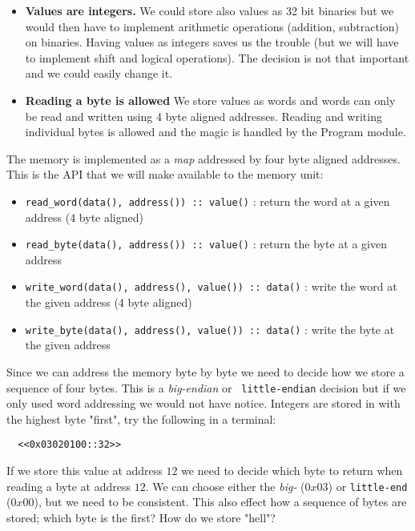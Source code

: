 \documentclass[a4paper,11pt]{article}
\begin{document}
\begin{itemize}

\item {\bf Values are integers.}  We could store also values as 32 bit
  binaries but we would then have to implement arithmetic operations
  (addition, subtraction) on binaries. Having values as integers saves
  us the trouble (but we will have to implement shift and logical
  operations). The decision is not that important and we could easily
  change it.

\item {\bf Reading a byte is allowed} We store values as words and
  words can only be read and written using 4 byte aligned
  addresses. Reading and writing individual bytes is allowed and the
  magic is handled by the Program module. 
\end{itemize}

The memory is implemented as a {\em map} addressed by four byte
aligned addresses. This is the API that we will make available to the
memory unit:

\begin{itemize}
\item {\tt read\_word(data(), address()) :: value()} : return the word  at a given address (4 byte aligned)
\item {\tt read\_byte(data(), address()) :: value()} : return the byte at a given address  
\item {\tt write\_word(data(), address(), value()) :: data()} : write the word at the given address (4 byte aligned)
\item {\tt write\_byte(data(), address(), value()) :: data()} : write the byte at the given address
\end{itemize}

Since we can address the memory byte by byte we need to decide how we
store a sequence of four bytes. This is a {\em big-endian} or {\tt
  little-endian} decision but if we only used word addressing we would
not have notice. Integers are stored in with the highest byte "first",
try the following in a terminal:

\begin{verbatim}
  <<0x03020100::32>>
\end{verbatim}

If we store this value at address $12$ we need to decide which byte to
return when reading a byte at address $12$. We can choose either the
{\em big-} ($0x03$) or {\tt little-end}
($0x00$), but we need to be consistent. This also effect how a
sequence of bytes are stored; which byte is the first? How do we store
"hell"?
\end{document}
